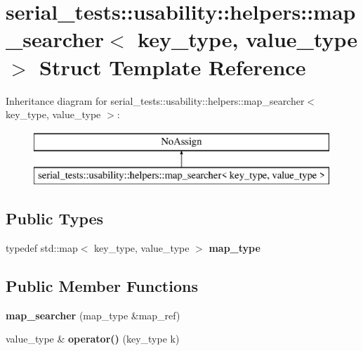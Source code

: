 \hypertarget{structserial__tests_1_1usability_1_1helpers_1_1map__searcher}{}\section{serial\+\_\+tests\+:\+:usability\+:\+:helpers\+:\+:map\+\_\+searcher$<$ key\+\_\+type, value\+\_\+type $>$ Struct Template Reference}
\label{structserial__tests_1_1usability_1_1helpers_1_1map__searcher}
Inheritance diagram for serial\+\_\+tests\+:\+:usability\+:\+:helpers\+:\+:map\+\_\+searcher$<$ key\+\_\+type, value\+\_\+type $>$\+:\begin{figure}[H]
\begin{center}
\leavevmode
\includegraphics[height=2.000000cm]{structserial__tests_1_1usability_1_1helpers_1_1map__searcher}
\end{center}
\end{figure}
\subsection*{Public Types}
\begin{DoxyCompactItemize}
\item 
\hypertarget{structserial__tests_1_1usability_1_1helpers_1_1map__searcher_a632419c563c1117a9dc523659a4f5638}{}typedef std\+::map$<$ key\+\_\+type, value\+\_\+type $>$ {\bfseries map\+\_\+type}\label{structserial__tests_1_1usability_1_1helpers_1_1map__searcher_a632419c563c1117a9dc523659a4f5638}

\end{DoxyCompactItemize}
\subsection*{Public Member Functions}
\begin{DoxyCompactItemize}
\item 
\hypertarget{structserial__tests_1_1usability_1_1helpers_1_1map__searcher_adf1392d615a54877f757b4b12ef84af7}{}{\bfseries map\+\_\+searcher} (map\+\_\+type \&map\+\_\+ref)\label{structserial__tests_1_1usability_1_1helpers_1_1map__searcher_adf1392d615a54877f757b4b12ef84af7}

\item 
\hypertarget{structserial__tests_1_1usability_1_1helpers_1_1map__searcher_a2dc2b205e8577aac01c341b3b4577835}{}value\+\_\+type \& {\bfseries operator()} (key\+\_\+type k)\label{structserial__tests_1_1usability_1_1helpers_1_1map__searcher_a2dc2b205e8577aac01c341b3b4577835}

\end{DoxyCompactItemize}
